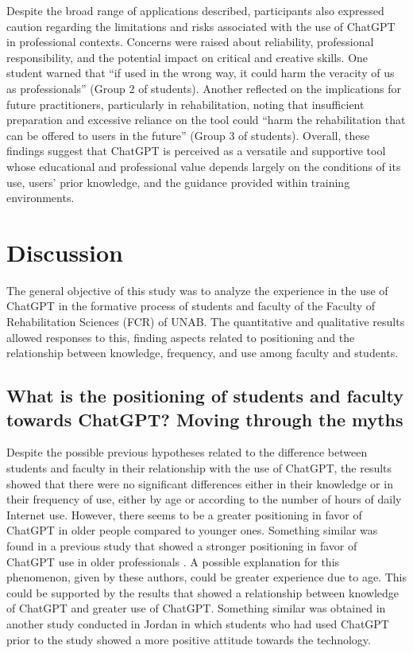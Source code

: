 \documentclass[english]{textolivre}
\begin{document}
Despite the broad range of applications described, participants also expressed caution regarding the limitations and risks associated with the use of ChatGPT in professional contexts. Concerns were raised about reliability, professional responsibility, and the potential impact on critical and creative skills. One student warned that “if used in the wrong way, it could harm the veracity of us as professionals” (Group 2 of students). Another reflected on the implications for future practitioners, particularly in rehabilitation, noting that insufficient preparation and excessive reliance on the tool could “harm the rehabilitation that can be offered to users in the future” (Group 3 of students). Overall, these findings suggest that ChatGPT is perceived as a versatile and supportive tool whose educational and professional value depends largely on the conditions of its use, users’ prior knowledge, and the guidance provided within training environments.

\section{Discussion}\label{sec-idioma}
The general objective of this study was to analyze the experience in the use of ChatGPT in the formative process of students and faculty of the Faculty of Rehabilitation Sciences (FCR) of UNAB. The quantitative and qualitative results allowed responses to this, finding aspects related to positioning and the relationship between knowledge, frequency, and use among faculty and students.

\subsection{What is the positioning of students and faculty towards ChatGPT? Moving through the myths}

Despite the possible previous hypotheses related to the difference between students and faculty in their relationship with the use of ChatGPT, the results showed that there were no significant differences either in their knowledge or in their frequency of use, either by age or according to the number of hours of daily Internet use. However, there seems to be a greater positioning in favor of ChatGPT in older people compared to younger ones. Something similar was found in a previous study that showed a stronger positioning in favor of ChatGPT use in older professionals \cite{belaldavar2024dentistry}. A possible explanation for this phenomenon, given by these authors, could be greater experience due to age. This could be supported by the results that showed a relationship between knowledge of ChatGPT and greater use of ChatGPT. Something similar was obtained in another study conducted in Jordan \cite{sallam2023health} in which students who had used ChatGPT prior to the study showed a more positive attitude towards the technology.
\end{document}

